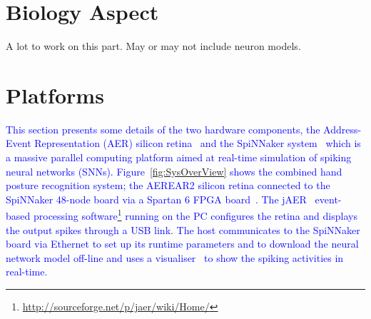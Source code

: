 \section{Biology Aspect}
\label{sec:bio}
A lot to work on this part.
May or may not include neuron models.

\section{Platforms}
\label{sec:plt}

\textcolor{blue}{
This section presents some details of the two hardware components, the Address-Event Representation (AER) silicon retina~\cite{lenero20113} and the SpiNNaker system~\cite{furber2014spinnaker} which is a massive parallel computing platform aimed at real-time simulation of spiking neural networks (SNNs). 
Figure~\ref{fig:SysOverView} shows the combined hand posture recognition system; 
the AEREAR2 silicon retina connected to the SpiNNaker 48-node board via a Spartan 6 FPGA board~\cite{galluppi2012real}.%
The jAER~\cite{delbruck2008frame} event-based processing software\footnote{\url{http://sourceforge.net/p/jaer/wiki/Home/}} running on the PC configures the retina and displays the output spikes through a USB link.
The host communicates to the SpiNNaker board via Ethernet to set up its runtime parameters and to download the neural network model off-line and uses a visualiser~\cite{6252490} to show the spiking activities in real-time.
}

